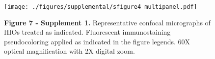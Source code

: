 \documentclass[9pt,lineo]{elife}
\date{\today}
\title{}
\begin{document}
\begin{figure}
\begin{fullwidth}
\centering\texttt{[image: ./figures/supplemental/sfigure4\_multipanel.pdf]}
\caption*{\textbf{Figure 7 - Supplement 1. }Representative confocal micrographs of HIOs treated as indicated. Fluorescent immunostaining pseudocoloring applied as indicated in the figure legends. 60X optical magnification with 2X digital zoom.}
\label{fig:fullwidth}
\end{fullwidth}
\end{figure}
\end{document}
